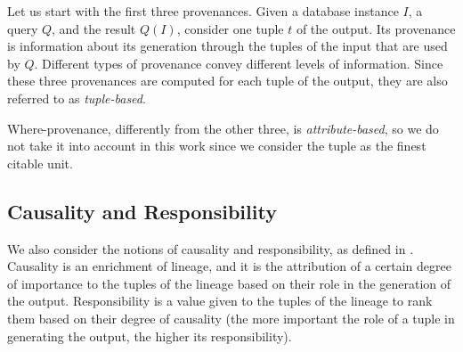 \documentclass[preprint,12pt,sort&compress]{elsarticle}
\newcommand{\rtwo}[1]{\textcolor{reviewer2}{#1}}
\begin{document}
Let us start with the first three provenances. Given a database instance $I$, a query $Q$, and the result $Q(I)$, consider one tuple $t$ of the output. 
Its provenance is information about its generation through the tuples of the input that are used by $Q$. Different types of provenance convey different levels of information. Since these three provenances are computed for each tuple of the output, they are also referred to as \emph{tuple-based}.

%
%
%

Where-provenance, differently from the other three, is \emph{attribute-based}, so we do not take it into account in this work since we consider the tuple as the finest citable unit. 

\subsection{Causality and Responsibility}
\rtwo{We also consider the notions of causality and responsibility, as defined in 
\cite{MeliouGMS11}. Causality is an enrichment of lineage, and it is the attribution of a certain degree of importance to the tuples of the lineage based on their role in the generation of the output. Responsibility is a value given to the tuples of the lineage to rank them based on their degree of causality (the more important the role of a tuple in generating the output, the higher its responsibility)}.
\end{document}
